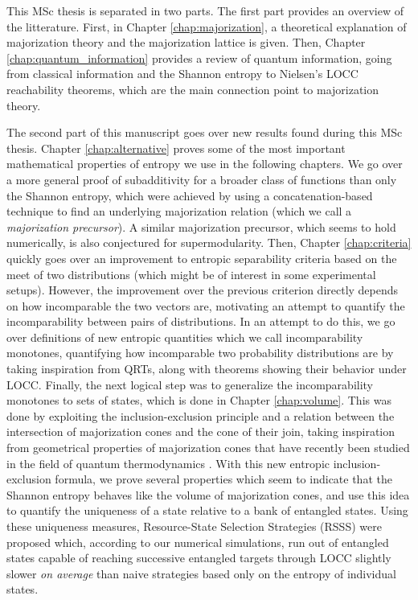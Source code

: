 This MSc thesis is separated in two parts. The first part provides an overview of the litterature. First, in Chapter \ref{chap:majorization}, a theoretical explanation of majorization theory and the majorization lattice is given. Then, Chapter \ref{chap:quantum_information} provides a review of quantum information, going from classical information and the Shannon entropy to Nielsen's LOCC reachability theorems, which are the main connection point to majorization theory.

The second part of this manuscript goes over new results found during this MSc thesis. Chapter \ref{chap:alternative} proves some of the most important mathematical properties of entropy we use in the following chapters. We go over a more general proof of subadditivity for a broader class of functions than only the Shannon entropy, which were achieved by using a concatenation-based technique to find an underlying majorization relation (which we call a \textit{majorization precursor}). A similar majorization precursor, which seems to hold numerically, is also conjectured for supermodularity. Then, Chapter \ref{chap:criteria} quickly goes over an improvement to entropic separability criteria based on the meet of two distributions (which might be of interest in some experimental setups). However, the improvement over the previous criterion directly depends on how incomparable the two vectors are, motivating an attempt to quantify the incomparability between pairs of distributions. In an attempt to do this, we go over definitions of new entropic quantities which we call incomparability monotones, quantifying how incomparable two probability distributions are by taking inspiration from QRTs, along with theorems showing their behavior under LOCC. Finally, the next logical step was to generalize the incomparability monotones to sets of states, which is done in Chapter \ref{chap:volume}. This was done by exploiting the inclusion-exclusion principle and a relation between the intersection of majorization cones and the cone of their join, taking inspiration from geometrical properties of majorization cones that have recently been studied in the field of quantum thermodynamics \cite{junior_geometric_2022}. With this new entropic inclusion-exclusion formula, we prove several properties which seem to indicate that the Shannon entropy behaves like the volume of majorization cones, and use this idea to quantify the uniqueness of a state relative to a bank of entangled states. Using these uniqueness measures, Resource-State Selection Strategies (RSSS) were proposed which, according to our numerical simulations, run out of entangled states capable of reaching successive entangled targets through LOCC slightly slower \textit{on average} than naive strategies based only on the entropy of individual states.
